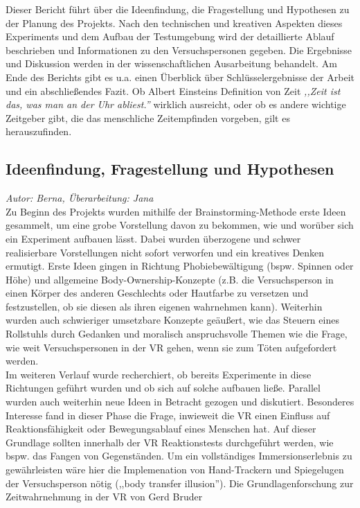 \documentclass{Bericht}
\begin{document}
Dieser Bericht führt über die Ideenfindung, die Fragestellung und Hypothesen zu der Planung des Projekts. Nach den technischen und kreativen Aspekten dieses Experiments und dem Aufbau der Testumgebung wird der detaillierte Ablauf beschrieben und Informationen zu den Versuchspersonen gegeben. Die Ergebnisse und Diskussion werden in der wissenschaftlichen Ausarbeitung behandelt. Am Ende des Berichts gibt es u.a. einen Überblick über Schlüsselergebnisse der Arbeit und ein abschließendes Fazit. 	Ob  Albert Einsteins Definition von Zeit \textit{,,Zeit ist das, was man an der Uhr abliest.'' }\cite{einstein} wirklich ausreicht, oder ob es andere wichtige Zeitgeber gibt, die das menschliche Zeitempfinden vorgeben, gilt es herauszufinden. 

\subsection{Ideenfindung, Fragestellung und Hypothesen}
\label{subsec:ideenfindung}
\textit{Autor: Berna, Überarbeitung: Jana}\\
Zu Beginn des Projekts wurden mithilfe der Brainstorming-Methode erste Ideen gesammelt, um eine grobe Vorstellung davon zu bekommen, wie und worüber sich ein Experiment aufbauen lässt. Dabei wurden überzogene und schwer realisierbare Vorstellungen nicht sofort verworfen und ein kreatives Denken ermutigt.
Erste Ideen gingen in Richtung Phobiebewältigung (bspw. Spinnen oder Höhe) und allgemeine Body-Ownership-Konzepte (z.B. die Versuchsperson in einen Körper des anderen Geschlechts oder Hautfarbe zu versetzen und festzustellen, ob sie diesen als ihren eigenen wahrnehmen kann). Weiterhin wurden auch schwieriger umsetzbare Konzepte geäußert, wie das Steuern eines Rollstuhls durch Gedanken und moralisch anspruchsvolle Themen wie die Frage, wie weit Versuchspersonen in der VR gehen, wenn sie zum Töten aufgefordert werden.\\
Im weiteren Verlauf wurde recherchiert, ob bereits Experimente in diese Richtungen geführt wurden und ob sich auf solche aufbauen ließe. Parallel wurden auch weiterhin neue Ideen in Betracht gezogen und diskutiert. Besonderes Interesse fand in dieser Phase die Frage, inwieweit die VR einen Einfluss auf Reaktionsfähigkeit oder Bewegungsablauf eines Menschen hat. Auf dieser Grundlage sollten innerhalb der VR Reaktionstests durchgeführt werden, wie bspw. das Fangen von Gegenständen. Um ein vollständiges Immersionserlebnis zu gewährleisten wäre hier die Implemenation von Hand-Trackern und Spiegelugen der Versuchsperson nötig (,,body transfer illusion''). Die Grundlagenforschung zur Zeitwahrnehmung in der VR von Gerd Bruder\cite{voices} 
\end{document}

